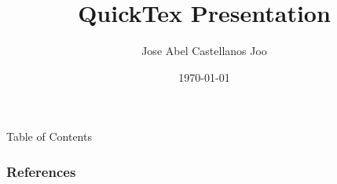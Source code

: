 \documentclass{beamer}
\begin{document}
\title{QuickTex Presentation}  
\author{Jose Abel Castellanos Joo}
\date{\today} 

\frame{\titlepage} 

\begin{frame}[allowframebreaks]{Table of Contents}
  \tableofcontents[sections={1-2}]
  \framebreak
  \tableofcontents[sections={3-5}]
\end{frame}





\begin{frame}[allowframebreaks]
  \frametitle{References}
%  
%  
\end{frame}
\end{document}
